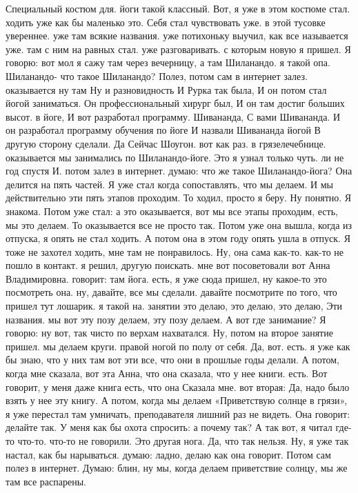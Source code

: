 Специальный костюм для.
йоги такой классный. Вот, я уже в этом костюме стал.
ходить уже как бы маленько это.
Себя стал чувствовать уже.
в этой тусовке увереннее. уже там всякие названия.
уже потихоньку выучил, как все называется уже.
там с ним на равных стал.
уже разговаривать. с которым новую я пришел. Я говорю: вот мол я сажу там через вечерницу, а там Шиланандо.
я такой опа.
Шиланандо- что такое Шиланандо? Полез, потом сам в интернет залез.
оказывается ну там Ну и разновидность И Рурка так была, И он потом стал йогой заниматься. Он профессиональный хирург был, И он там достиг больших высот.
в йоге, И вот разработал программу.
Шивананда, С вами Шивананда.
И он разработал программу обучения по йоге И назвали
Шивананда йогой В другую сторону сделали.
Да Сейчас Шоугон.
вот как раз.
в грязелечебнице. оказывается мы занимались по Шиланандо-йоге. Это я узнал только чуть.
ли не год спустя И.
потом залез в интернет. думаю: что же такое Шиланандо-йога?
Она делится на пять частей.
Я уже стал когда сопоставлять, что мы делаем.
И мы действительно эти пять этапов проходим.
То ходил, просто я беру.
Ну понятно.
Я знакома.
Потом уже стал: а это оказывается, вот мы все этапы проходим, есть, мы это делаем.
То оказывается все не просто так.
Потом уже она вышла, когда из отпуска, я опять не стал ходить.
А потом она в этом году опять ушла в отпуск.
Я тоже не захотел ходить, мне там не понравилось.
Ну, она сама как-то.
как-то не пошло в контакт.
я решил, другую поискать. мне вот посоветовали вот Анна Владимировна.
говорит: там йога.
есть, я уже сюда пришел, ну какое-то это посмотреть она. ну, давайте, все мы сделали. давайте посмотрите по того, что пришел тут лошарик.
я такой на.
занятии это делаю, это делаю, это делаю, Эти названия. мы вот эту позу делаем, эту позу делаем. А вот где занимание? Я говорю: ну вот, так чисто по верхам нахватался. Ну, потом на второе занятие пришел.
мы делаем круги.
правой ногой по полу от себя. Да, вот.
есть. я уже как бы знаю, что у них там вот эти все, что они в прошлые годы делали. А потом, когда мне сказала, вот эта Анна, что она сказала,
что у нее книги.
есть.
Вот говорит, у меня даже книга есть, что она Сказала мне. вот вторая:
Да, надо было взять у нее эту книгу.
А потом, когда мы делаем «Приветствую солнце в грязи», я уже перестал там умничать, преподавателя лишний раз не видеть.
Она говорит: делайте так.
У меня как бы охота спросить: а почему так?
А так вот, я читал где-то что-то.
что-то не говорили. Это другая нога.
Да, что так нельзя. Ну, я уже так настал, как бы нарываться. думаю: ладно, делаю как она говорит. Потом сам полез в интернет. Думаю: блин, ну мы, когда делаем приветствие солнцу, мы же там все распарены.
